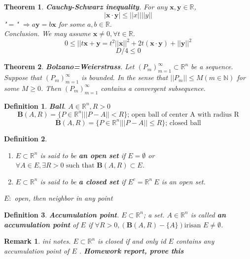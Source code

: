 \documentclass[a4paper,10pt]{article}
\newtheorem{remark}{Remark}
\newtheorem{theo}{Theorem}
\newtheorem{defi}{Definition}
\begin{document}
\begin{theo}
	\textbf{Cauchy-Schwarz inequality}. For any $ \mathbf{x}, \mathbf{y} \in \mathbb{R} $,
	\[ |\mathbf{x} \cdot \mathbf{y}| \leq ||x|| ||y||\]
	"$ = $" $ \Rightarrow  a\mathbf{y} = b\mathbf{x}$ for some $ a,b \in \mathbb{R} $.\\
	Conclusion. We may assume $ \mathbf{x} \neq 0 , \forall t \in \mathbb{R} $.
	\[ 0 \leq ||t\mathbf{x}+\mathbf{y} = t^2||\mathbf{x}||^2+2t(\mathbf{x}\cdot\mathbf{y})+||\mathbf{y}||^2 \]
	\[D/4 \leq 0\]
\end{theo}

\begin{theo}
	\textbf{Bolzano=Weierstrass}. Let $ (P_{m})_{m=1}^{\infty} \subset \mathbb{R}^n $ be a sequence. Suppose that $ (P_{m})_{m=1}^{\infty} $ is bounded. In the sense that $ ||P_{m}|| \leq M (m \in \mathbb{N}) $ for some $ M \geq 0 $. Then $ (P_{m})_{m=1}^{\infty} $ contains a convergent subsequence.
\end{theo}

\begin{defi}
	\textbf{Ball}. $ A \in \mathbb{R}^n, R>0 $
	\[ \mathbf{B}(A,R) = \{ P \in \mathbb{R}^n | ||P-A||<R \} \text{; open ball of center A with radius R} \]
	\[ \bar{\mathbf{B}}(A,R) = \{ P \in \mathbb{R}^n | ||P-A||\leq R \} \text{; closed ball} \]
\end{defi}

\begin{defi}
	\begin{enumerate}
		\item $ E \subset \mathbb{R}^n $ is said to be \textbf{an open set} if $ E = \emptyset $ or $ \forall A \in E , \exists R>0 \text{ such that } \mathbf{B}(A,R) \subset E $.
		\item $ E \subset \mathbb{R}^n $ is said to be \textbf{a closed set} if $ E^{c} = \mathbb{R}^n \ E $ is an open set.
	\end{enumerate}
	$ E : $ open, then neighbor in any point %
\end{defi}

\begin{defi}
	\textbf{Accumulation point}. $ E \subset \mathbb{R}^n $; a set. $ A \in \mathbb{R}^n $ is called \textbf{an accumulation point} of $ E $ if $ \forall R>0, (\mathbf{B}(A,R)-\{A\}) \text{irisan } E \neq \emptyset $.
\end{defi}

\begin{remark}
	ini notes. $ E \subset \mathbb{R}^n $ is closed if and only id $ E $ contains any accumulation point of $ E $ . \textbf{Homework report, prove this}
\end{remark}
\end{document}
